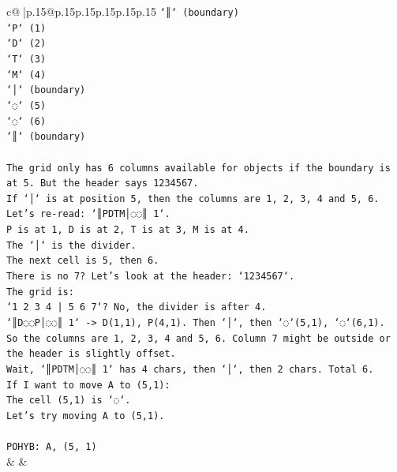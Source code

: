 \documentclass{article}
\begin{document}
{\begin{supertabular}{c@{$\;$}|p{.15\linewidth}@{}p{.15\linewidth}p{.15\linewidth}p{.15\linewidth}p{.15\linewidth}p{.15\linewidth}}
{{{\texttt{`║` (boundary)} \\
\texttt{`P` (1)} \\
\texttt{`D` (2)} \\
\texttt{`T` (3)} \\
\texttt{`M` (4)} \\
\texttt{`│` (boundary)} \\
\texttt{`◌` (5)} \\
\texttt{`◌` (6)} \\
\texttt{`║` (boundary)} \\
\\ 
\texttt{The grid only has 6 columns available for objects if the boundary is at 5. But the header says 1234567.} \\
\texttt{If `│` is at position 5, then the columns are 1, 2, 3, 4 and 5, 6.} \\
\texttt{Let's re{-}read: `║PDTM│◌◌║ 1`.} \\
\texttt{P is at 1, D is at 2, T is at 3, M is at 4.} \\
\texttt{The `│` is the divider.} \\
\texttt{The next cell is 5, then 6.} \\
\texttt{There is no 7? Let's look at the header: `1234567`.} \\
\texttt{The grid is:} \\
\texttt{`1 2 3 4 | 5 6 7`? No, the divider is after 4.} \\
\texttt{`║D◌◌P│◌◌║ 1` {-}> D(1,1), P(4,1). Then `│`, then `◌`(5,1), `◌`(6,1).} \\
\texttt{So the columns are 1, 2, 3, 4 and 5, 6. Column 7 might be outside or the header is slightly offset.} \\
\texttt{Wait, `║PDTM│◌◌║ 1` has 4 chars, then `│`, then 2 chars. Total 6.} \\
\texttt{If I want to move A to (5,1):} \\
\texttt{The cell (5,1) is `◌`.} \\
\texttt{Let's try moving A to (5,1).} \\
\\ 
\texttt{POHYB: A, (5, 1)} \\
            }
        }
    }
    & & \\ \\


\end{supertabular}}
\end{document}
